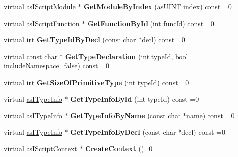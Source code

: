 \begin{DoxyCompactItemize}
virtual \hyperlink{classas_i_script_module}{as\+I\+Script\+Module} $\ast$ {\bfseries Get\+Module\+By\+Index} (as\+U\+I\+NT index) const =0
\item 
\mbox{\label{classas_i_script_engine_aaf67dc0b1f26be437ccbcc0ac5f330c9}} 
virtual \hyperlink{classas_i_script_function}{as\+I\+Script\+Function} $\ast$ {\bfseries Get\+Function\+By\+Id} (int func\+Id) const =0
\item 
\mbox{\label{classas_i_script_engine_ad1f6fecb0f53fd7966736b01f65c3dcb}} 
virtual int {\bfseries Get\+Type\+Id\+By\+Decl} (const char $\ast$decl) const =0
\item 
\mbox{\label{classas_i_script_engine_a3ae23fcde6af0d816ff97097cd443281}} 
virtual const char $\ast$ {\bfseries Get\+Type\+Declaration} (int type\+Id, bool include\+Namespace=false) const =0
\item 
\mbox{\label{classas_i_script_engine_a39b7207a6c4c55a5cbf10eab2ccfb8e6}} 
virtual int {\bfseries Get\+Size\+Of\+Primitive\+Type} (int type\+Id) const =0
\item 
\mbox{\label{classas_i_script_engine_a55cc2d9592651538efcf79eb8106a867}} 
virtual \hyperlink{classas_i_type_info}{as\+I\+Type\+Info} $\ast$ {\bfseries Get\+Type\+Info\+By\+Id} (int type\+Id) const =0
\item 
\mbox{\label{classas_i_script_engine_aea2583b8aa724779b7c37df8b7fa437b}} 
virtual \hyperlink{classas_i_type_info}{as\+I\+Type\+Info} $\ast$ {\bfseries Get\+Type\+Info\+By\+Name} (const char $\ast$name) const =0
\item 
\mbox{\label{classas_i_script_engine_ab00808f9b762c4badf508ed511789d1b}} 
virtual \hyperlink{classas_i_type_info}{as\+I\+Type\+Info} $\ast$ {\bfseries Get\+Type\+Info\+By\+Decl} (const char $\ast$decl) const =0
\item 
\mbox{\label{classas_i_script_engine_a2630e1cd03ffab0fee9b820bf0afe42a}} 
virtual \hyperlink{classas_i_script_context}{as\+I\+Script\+Context} $\ast$ {\bfseries Create\+Context} ()=0
\item 

\end{DoxyCompactItemize}
